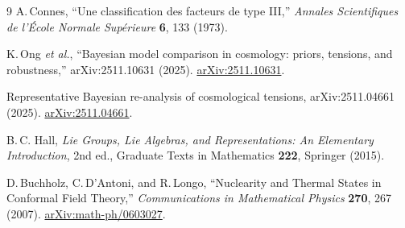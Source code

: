 \documentclass[11pt]{article}
\theoremstyle{plain}
\theoremstyle{definition}
\theoremstyle{remark}
\begin{document}
\begin{thebibliography}{9}
A.\,Connes,
``Une classification des facteurs de type III,''
\textit{Annales Scientifiques de l'École Normale Supérieure} \textbf{6}, 133 (1973).

K.\,Ong \textit{et al.},
``Bayesian model comparison in cosmology: priors, tensions, and robustness,''
arXiv:2511.10631 (2025).
\href{https://arxiv.org/abs/2511.10631}{arXiv:2511.10631}.

Representative Bayesian re-analysis of cosmological tensions,
arXiv:2511.04661 (2025).
\href{https://arxiv.org/abs/2511.04661}{arXiv:2511.04661}.

B.\,C. Hall,
\textit{Lie Groups, Lie Algebras, and Representations: An Elementary Introduction},
2nd ed., Graduate Texts in Mathematics \textbf{222}, Springer (2015).

D.\,Buchholz, C.\,D'Antoni, and R.\,Longo,
``Nuclearity and Thermal States in Conformal Field Theory,''
\textit{Communications in Mathematical Physics} \textbf{270}, 267 (2007).
\href{https://arxiv.org/abs/math-ph/0603027}{arXiv:math-ph/0603027}.

\end{thebibliography}
\end{document}
